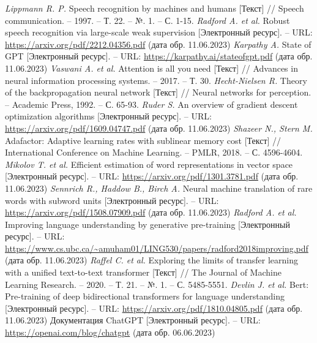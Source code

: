 \begin{thebibliography}{99}
  \textit{Lippmann R. P.} Speech recognition by machines and humans [Текст] // Speech communication. – 1997. – Т. 22. – №. 1. – С. 1-15.
  \textit{Radford A. et al.} Robust speech recognition via large-scale weak supervision [Электронный ресурс]. -- URL: \url{https://arxiv.org/pdf/2212.04356.pdf} (дата обр. 11.06.2023)
  \textit{Karpathy A.} State of GPT [Электронный ресурс]. -- URL: \url{https://karpathy.ai/stateofgpt.pdf} (дата обр. 11.06.2023)
  \textit{Vaswani A. et al.} Attention is all you need [Текст] // Advances in neural information processing systems. – 2017. – Т. 30.
  \textit{Hecht-Nielsen R.} Theory of the backpropagation neural network [Текст] // Neural networks for perception. – Academic Press, 1992. – С. 65-93.
  \textit{Ruder S.} An overview of gradient descent optimization algorithms [Электронный ресурс]. -- URL: \url{https://arxiv.org/pdf/1609.04747.pdf} (дата обр. 11.06.2023)
  \textit{Shazeer N., Stern M.} Adafactor: Adaptive learning rates with sublinear memory cost [Текст] // International Conference on Machine Learning. – PMLR, 2018. – С. 4596-4604.
  \textit{Mikolov T. et al.} Efficient estimation of word representations in vector space [Электронный ресурс]. -- URL: \url{https://arxiv.org/pdf/1301.3781.pdf} (дата обр. 11.06.2023)
  \textit{Sennrich R., Haddow B., Birch A.} Neural machine translation of rare words with subword units [Электронный ресурс]. -- URL: \url{https://arxiv.org/pdf/1508.07909.pdf} (дата обр. 11.06.2023)
  \textit{Radford A. et al.} Improving language understanding by generative pre-training [Электронный ресурс].  -- URL: \url{https://www.cs.ubc.ca/~amuham01/LING530/papers/radford2018improving.pdf} (дата обр. 11.06.2023)
  \textit{Raffel C. et al.} Exploring the limits of transfer learning with a unified text-to-text transformer [Текст] // The Journal of Machine Learning Research. – 2020. – Т. 21. – №. 1. – С. 5485-5551.
  \textit{Devlin J. et al.} Bert: Pre-training of deep bidirectional transformers for language understanding [Электронный ресурс]. -- URL: \url{https://arxiv.org/pdf/1810.04805.pdf} (дата обр. 11.06.2023)
  Документация ChatGPT [Электронный ресурс]. -- URL: \url{https://openai.com/blog/chatgpt} (дата обр. 06.06.2023)

\end{thebibliography}
